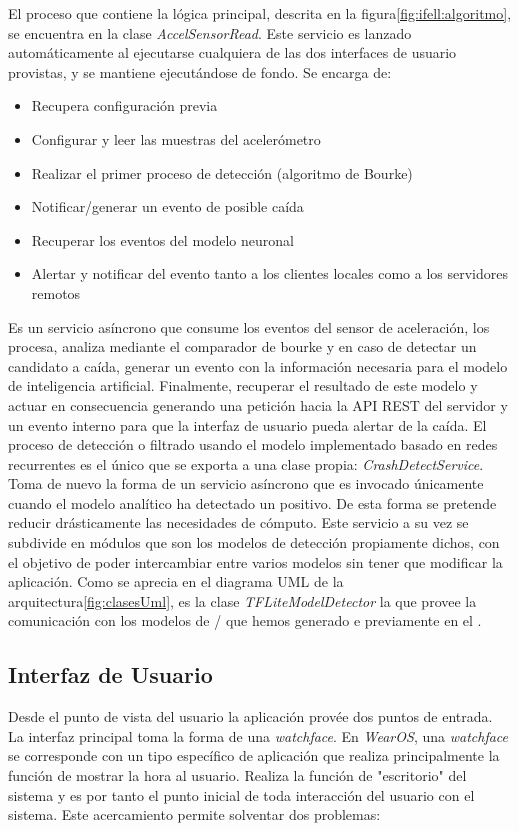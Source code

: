 
El proceso que contiene la lógica principal, descrita en la figura\ref{fig:ifell:algoritmo}, se encuentra en la clase \textit{AccelSensorRead}. Este servicio es lanzado automáticamente al ejecutarse cualquiera de las dos interfaces de usuario provistas, y se mantiene ejecutándose de fondo. Se encarga de:

\begin{itemize}
  \item Recupera configuración previa
  \item Configurar y leer las muestras del acelerómetro
  \item Realizar el primer proceso de detección (algoritmo de Bourke)
  \item Notificar/generar un evento de posible caída
  \item Recuperar los eventos del modelo neuronal
  \item Alertar y notificar del evento tanto a los clientes locales como a los servidores remotos
\end{itemize}


Es un servicio asíncrono que consume los eventos del sensor de aceleración, los procesa, analiza mediante el comparador de bourke y en caso de detectar un candidato a caída, generar un evento con la información necesaria para el modelo de inteligencia artificial. Finalmente, recuperar el resultado de este modelo y actuar en consecuencia generando una petición hacia la API REST del servidor y un evento interno para que la interfaz de usuario pueda alertar de la caída.
El proceso de detección o filtrado usando el modelo implementado basado en redes recurrentes es el único que se exporta a una clase propia: \textit{CrashDetectService}. Toma de nuevo la forma de un servicio asíncrono que es invocado únicamente cuando el modelo analítico ha detectado un positivo. De esta forma se pretende reducir drásticamente las necesidades de cómputo. Este servicio a su vez se subdivide en módulos que son los modelos de detección propiamente dichos, con el objetivo de poder intercambiar entre varios modelos sin tener que modificar la aplicación. Como se aprecia en el diagrama UML de la arquitectura\ref{fig:clasesUml}, es la clase \textit{TFLiteModelDetector} la que provee la comunicación con los modelos de \tflite/ que hemos generado e previamente en el . 


\subsection{Interfaz de Usuario}
Desde el punto de vista del usuario la aplicación provée dos puntos de entrada. La interfaz principal toma la forma de una \textit{watchface}. En \textit{WearOS}, una \textit{watchface} se corresponde con un tipo específico de aplicación que realiza principalmente la función de mostrar la hora al usuario. Realiza la función de "escritorio" del sistema y es por tanto el punto inicial de toda interacción del usuario con el sistema. Este acercamiento permite solventar dos problemas:

